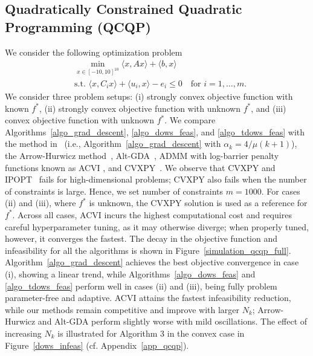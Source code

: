 \documentclass{article}
\def\la{\langle}
\def\ra{\rangle}
\theoremstyle{plain}
\theoremstyle{definition}
\theoremstyle{remark}
\begin{document}
\subsection{Quadratically Constrained Quadratic Programming (QCQP)}
We consider the following optimization problem
\begin{align*}
    &\min_{x \in [-10,10]^{10}} \la x, A x \ra + \la b, x \ra \\
    & \text{s.t. } \la x , C_i x \ra + \la u_i , x \ra - e_i  \leq 0 \quad \text{for } i = 1, \ldots, m. 
\end{align*}
We consider three problem setups: (i) strongly convex objective function with known $f^*$, (ii) strongly convex objective function with unknown $f^*$, and (iii) convex objective function with unknown $f^*$. We compare Algorithms~\ref{algo_grad_descent}, \ref{algo_dows_feas}, and \ref{algo_tdows_feas} with the method in~\cite{nedic2019random} (i.e., Algorithm~\ref{algo_grad_descent} with $\alpha_k = {4}/{\mu(k+1)}$), the Arrow-Hurwicz method~\cite{he2022convergence}, Alt-GDA~\cite{zhang2022near}, ADMM with log-barrier penalty functions known as ACVI \cite{yang2022solving}, and CVXPY~\cite{diamond2016cvxpy, agrawal2018rewriting}. We observe that CVXPY and IPOPT~\cite{wachter2006implementation} fails for high-dimensional problems; CVXPY also fails when the number of constraints is large. Hence, we set number of constraints $m = 1000$. For cases (ii) and (iii), where $f^*$ is unknown, the CVXPY solution is used as a reference for $f^*$. Across all cases, ACVI incurs the highest computational cost and requires careful hyperparameter tuning, as it may otherwise diverge; when properly tuned, however, it converges the fastest. The decay in the objective function and infeasibility for all the algorithms is shown in Figure~\ref{simulation_qcqp_full}. Algorithm~\ref{algo_grad_descent} achieves the best objective convergence in case (i), showing a linear trend, while Algorithms~\ref{algo_dows_feas} and \ref{algo_tdows_feas} perform well in cases (ii) and (iii), being fully problem parameter-free and adaptive. ACVI attains the fastest infeasibility reduction, while our methods remain competitive and improve with larger $N_k$; Arrow-Hurwicz and Alt-GDA perform slightly worse with mild oscillations. The effect of increasing $N_k$ is illustrated for Algorithm 3 in the convex case in Figure~\ref{dows_infeas} (cf. Appendix~\ref{app_qcqp}).

\end{document}
